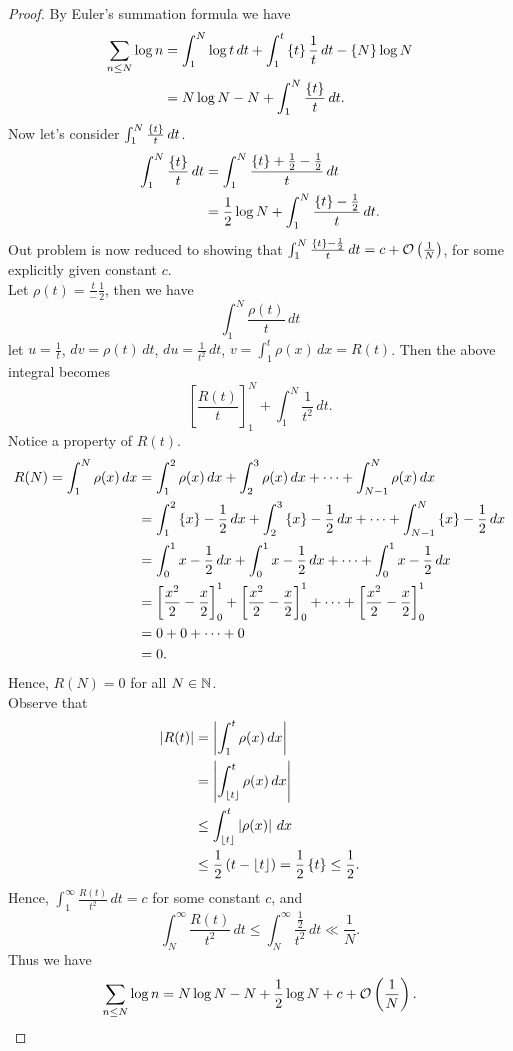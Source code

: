 \documentclass[twoside, openright, fontsize=10pt, headings=big]{scrbook}
\begin{document}
\begin{proof}
    By Euler's summation formula we have
    \begin{align*}
        \sum_{n\leq N}\log n&=\int_{1}^{N}\log t\,dt+\int_{1}^{t}\left\{ t \right\}\frac{1}{t}\,dt-\left\{ N \right\}\log N\\
        &=N\log N-N+\int_{1}^{N}\frac{\left\{ t \right\}}{t}\,dt.
    \end{align*}
    Now let's consider $\int_{1}^{N}\frac{\left\{ t \right\}}{t}\,dt$.
    \begin{align*}
        \int_{1}^{N}\frac{\left\{ t \right\}}{t}\,dt&=\int_{1}^{N}\frac{\left\{ t \right\}+\frac{1}{2}-\frac{1}{2}}{t}\,dt\\
        &=\frac{1}{2}\log N+\int_{1}^{N}\frac{\left\{ t \right\}-\frac{1}{2}}{t}\,dt.
    \end{align*}
    Out problem is now reduced to showing that $\int_{1}^{N}\frac{\left\{ t \right\}-\frac{1}{2}}{t}\,dt=c+\mathcal{O}\left(\frac{1}{N}\right)$, for some explicitly given constant $c$.\\
    Let $\rho(t)=\frac{t}-\frac{1}{2}$, then we have
    \[
        \int_{1}^{N}\frac{\rho(t)}{t}\,dt
    \]
    let $u=\frac{1}{t}$, $dv=\rho(t)\,dt$, $du=\frac{1}{t^2}\,dt$, $v=\int_{1}^{t}\rho(x)\,dx=R(t)$. Then the above integral becomes
    \[
        \left[\frac{R(t)}{t}\right]_1^N+\int_{1}^{N}\frac{1}{t^2}\,dt.
    \]
    Notice a property of $R(t)$.
    \begin{align*}
        R(N)=\int_{1}^{N}\rho(x)\,dx&=\int_{1}^{2}\rho(x)\,dx+\int_{2}^{3}\rho(x)\,dx+\cdots+\int_{N-1}^{N}\rho(x)\,dx\\
        &=\int_{1}^{2}\left\{ x \right\}-\frac{1}{2}\,dx+\int_{2}^{3}\left\{ x \right\}-\frac{1}{2}\,dx+\cdots+\int_{N-1}^{N}\left\{ x \right\}-\frac{1}{2}\,dx\\
        &=\int_{0}^{1}x-\frac{1}{2}\,dx+\int_{0}^{1}x-\frac{1}{2}\,dx+\cdots+\int_{0}^{1}x-\frac{1}{2}\,dx\\
        &=\left[\frac{x^2}{2}-\frac{x}{2}\right]_0^1+\left[\frac{x^2}{2}-\frac{x}{2}\right]_0^1+\cdots+\left[\frac{x^2}{2}-\frac{x}{2}\right]_0^1\\
        &=0+0+\cdots+0\\
        &=0.
    \end{align*}
    Hence, $R(N)=0$ for all $N\in\mathbb{N}$.\\
    Observe that
    \begin{align*}
        \left|R(t)\right|&=\left|\int_{1}^{t}\rho(x)\,dx\right|\\
        &=\left|\int_{\left\lfloor t \right\rfloor}^{t}\rho(x)\,dx\right|\\
        &\leq\int_{\left\lfloor t \right\rfloor}^{t}\left|\rho(x)\right|\,dx\\
        &\leq \frac{1}{2}\left(t-\left\lfloor t \right\rfloor\right)=\frac{1}{2}\left\{ t \right\}\leq\frac{1}{2}.
    \end{align*}
    Hence, $\int_{1}^{\infty}\frac{R(t)}{t^2}\,dt=c$ for some constant $c$, and 
    \[
        \int_{N}^{\infty}\frac{R(t)}{t^2}\,dt\leq \int_{N}^{\infty}\frac{\frac{1}{2}}{t^2}\,dt\ll\frac{1}{N}.
    \]
    Thus we have
    \[
        \sum_{n\leq N}\log n =N\log N-N+\frac{1}{2}\log N+c+\mathcal{O}\left(\frac{1}{N}\right).\qedhere
    \]
\end{proof}
\end{document}
